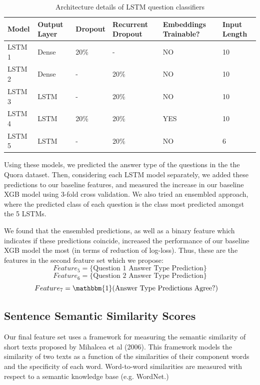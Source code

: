 \documentclass[letterpaper, 10 pt, conference]{ieeeconf}  %
\begin{document}
\begin{table}[]
\centering
\caption{Architecture details of LSTM question classifiers }
\label{my-label}
\begin{tabular}{|p{10mm}|p{10mm}|p{10mm}|p{10mm}|p{14mm}|p{8mm}|}
\hline
Model  & Output Layer & Dropout  & Recurrent Dropout & Embeddings Trainable? & Input Length \\ \hline
LSTM 1 & Dense             & 20\%                   & -                 & NO                    & 10           \\
LSTM 2 & Dense             & -                      & 20\%              & NO                    & 10           \\
LSTM 3 & LSTM              & -                      & 20\%              & NO                    & 10           \\
LSTM 4 & LSTM              & 20\%                   & 20\%              & YES                   & 10           \\
LSTM 5 & LSTM              & -                      & 20\%              & NO                    & 6            \\ \hline
\end{tabular}
\end{table}

Using these models, we predicted the answer type of the questions in the the Quora dataset. Then, considering each LSTM model separately, we added these predictions to our baseline features, and measured the increase in our baseline XGB model using 3-fold cross validation. We also tried an ensembled approach, where the predicted class of each question is the class most predicted amongst the 5 LSTMs.

We found that the ensembled predictions, as well as a binary feature which indicates if these predictions coincide, increased the performance of our baseline XGB model the most (in terms of reduction of log-loss). Thus, these are the features in the second feature set which we propose: 
$$
Feature_5 = \text{\{Question 1 Answer Type Prediction\}}
$$
$$
Feature_6 = \text{\{Question 2 Answer Type Prediction\}}
$$
$$
Feature_7 = \mathbbm{1}(\text{Answer Type Predictions Agree?})\quad
$$
\subsection{Sentence Semantic Similarity Scores}

Our final feature set uses a framework for measuring the semantic similarity of short texts proposed by Mihalcea et al (2006). This framework models the similarity of two texts as a function of the similarities of their component words and the specificity of each word. Word-to-word similarities are measured with respect to a semantic knowledge base (e.g. WordNet.)
\end{document}
